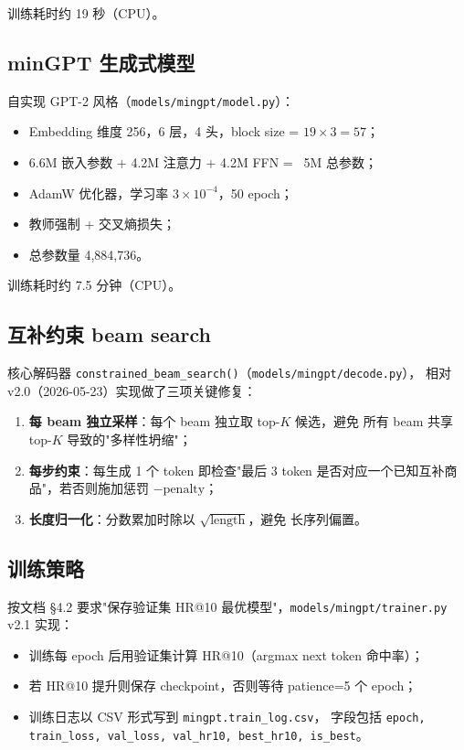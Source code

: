 \documentclass[12pt,a4paper]{article}
\begin{document}
训练耗时约 19 秒（CPU）。

\subsection{minGPT 生成式模型}
自实现 GPT-2 风格（\texttt{models/mingpt/model.py}）：
\begin{itemize}[leftmargin=2em]
    \item Embedding 维度 256，6 层，4 头，block size = $19 \times 3 = 57$；
    \item 6.6M 嵌入参数 + 4.2M 注意力 + 4.2M FFN = ~5M 总参数；
    \item AdamW 优化器，学习率 $3\times 10^{-4}$，50 epoch；
    \item 教师强制 + 交叉熵损失；
    \item 总参数量 4,884,736。
\end{itemize}

训练耗时约 7.5 分钟（CPU）。

\subsection{互补约束 beam search}
核心解码器 \texttt{constrained\_beam\_search()}（\texttt{models/mingpt/decode.py}），
相对 v2.0（2026-05-23）实现做了三项关键修复：
\begin{enumerate}[leftmargin=2em]
    \item \textbf{每 beam 独立采样}：每个 beam 独立取 top-$K$ 候选，避免
          所有 beam 共享 top-$K$ 导致的"多样性坍缩"；
    \item \textbf{每步约束}：每生成 1 个 token 即检查"最后 3 token
          是否对应一个已知互补商品"，若否则施加惩罚 $-\text{penalty}$；
    \item \textbf{长度归一化}：分数累加时除以 $\sqrt{\text{length}}$，避免
          长序列偏置。
\end{enumerate}

\subsection{训练策略}
按文档 \S 4.2 要求"保存验证集 HR@10 最优模型"，\texttt{models/mingpt/trainer.py}
v2.1 实现：
\begin{itemize}[leftmargin=2em]
    \item 训练每 epoch 后用验证集计算 HR@10（argmax next token 命中率）；
    \item 若 HR@10 提升则保存 checkpoint，否则等待 patience=5 个 epoch；
    \item 训练日志以 CSV 形式写到 \texttt{mingpt.train\_log.csv}，
          字段包括 \texttt{epoch, train\_loss, val\_loss, val\_hr10,
          best\_hr10, is\_best}。
\end{itemize}
\end{document}
